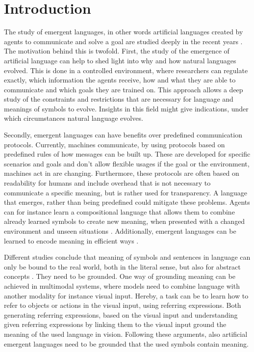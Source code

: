 \section{Introduction}
\label{sec:introduction}

The study of emergent languages, in other words artificial languages created by agents to communicate and solve a goal are studied deeply in the recent years \citep{Kirby2002,Kirby2008,Steels2009,Lazaridou2017,Baroni2020,Baroni2022}.
The motivation behind this is twofold.
First, the study of the emergence of artificial language can help to shed light into why and how natural languages evolved.
This is done in a controlled environment, where researchers can regulate exactly, which information the agents receive, how and what they are able to communicate and which goals they are trained on.
This approach allows a deep study of the constraints and restrictions that are necessary for language and meanings of symbols to evolve.
Insights in this field might give indications, under which circumstances natural language evolves.

Secondly, emergent languages can have benefits over predefined communication protocols.
Currently, machines communicate, by using protocols based on predefined rules of how messages can be built up.
These are developed for specific scenarios and goals and don't allow flexible usages if the goal or the environment, machines act in are changing.
Furthermore, these protocols are often based on readability for humans and include overhead that is not necessary to communicate a specific meaning, but is rather used for transparency.
A language that emerges, rather than being predefined could mitigate these problems.
Agents can for instance learn a compositional language that allows them to combine already learned symbols to create new meaning, when presented with a changed environment and unseen situations \citep{Kharitonov2020,Lazaridou2018,Gupta2020}.
Additionally, emergent languages can be learned to encode meaning in efficient ways \citep{Chaabouni2019,Zaslavsky2018}.

Different studies conclude that meaning of symbols and sentences in language can only be bound to the real world, both in the literal sense, but also for abstract concepts \citep{Harnad1999,Bender2020,Bisk2020}.
They need to be grounded.
One way of grounding meaning can be achieved in multimodal systems, where models need to combine language with another modality for instance visual input.
Hereby, a task can be to learn how to refer to objects or actions in the visual input, using referring expressions.
Both generating referring expressions, based on the visual input and understanding given referring expressions by linking them to the visual input ground the meaning of the used language in vision.
Following these arguments, also artificial emergent languages need to be grounded that the used symbols contain meaning.

